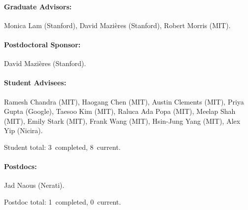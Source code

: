 \documentclass{article}
\begin{document}
\paragraph{Graduate Advisors:}
    Monica Lam (Stanford),
    David Mazi\`eres (Stanford),
    Robert Morris (MIT).

\paragraph{Postdoctoral Sponsor:}
    David Mazi\`eres (Stanford).

\paragraph{Student Advisees:}
    Ramesh Chandra (MIT),
    Haogang Chen (MIT),
    Austin Clements (MIT),
    Priya Gupta (Google),
    Taesoo Kim (MIT),
    Raluca Ada Popa (MIT),
    Meelap Shah (MIT),
    Emily Stark (MIT),
    Frank Wang (MIT),
    Hsin-Jung Yang (MIT),
    Alex Yip (Nicira).

    Student total: 3~completed, 8~current.

\paragraph{Postdocs:}
    Jad Naous (Nerati).

    Postdoc total: 1~completed, 0~current.
\end{document}

